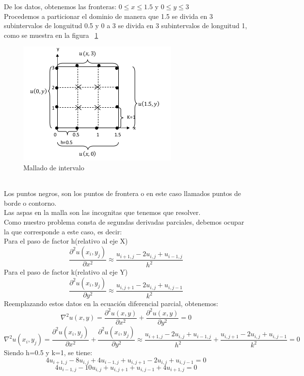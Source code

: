 \documentclass[11pt,a4paper]{article}
\begin{document}
De los datos, obtenemos las fronteras: $ 0 \le x \le 1.5$ y $ 0 \le y \le 3 $\\
Procedemos a particionar el dominio de manera que 1.5 se divida en 3 subintervalos de longuitud 0.5 y 0 a 3 se divida en 3 subintervalos de longuitud 1, como se muestra en la figura ~\ref{figura3}
\begin{figure}[htbp]
\begin{center}
\includegraphics[scale=0.75]{img_Sol_1}
\caption{Mallado de intervalo}
\label{figura3}
\end{center}
\end{figure}
\\Los puntos negros, son los puntos de frontera o en este caso llamados puntos de borde o contorno.\\Las aspas en la malla son las incognitas que tenemos que resolver.\\
Como nuestro problema consta de segundas derivadas parciales, debemos ocupar la que corresponde a este caso, es decir:\\
Para el paso de factor h(relativo al eje X)\\
$$
\frac{\partial^2 u(x_{i},y_{j})}{\partial x^2} \approx \frac{u_{i+1,j}-2u_{i,j}+u_{i-1,j}}{h^2}
$$
Para el paso de factor k(relativo al eje Y)\\
$$
\frac{\partial^2 u(x_{i},y_{j})}{\partial y^2} \approx \frac{u_{i,j+1}-2u_{i,j}+u_{i,j-1}}{k^2}
$$
Reemplazando estos datos en la ecuación diferencial parcial, obtenemos:
$$
\nabla^2 u(x,y) = \frac{\partial^2 u(x,y)}{\partial x^2} + \frac{\partial^2 u(x,y)}{\partial y^2} = 0
$$
$$
\nabla^2 u(x_{i},y_{j}) = \frac{\partial^2 u(x_{i},y_{j})}{\partial x^2} + \frac{\partial^2 u(x_{i},y_{j})}{\partial y^2} \approx \frac{u_{i+1,j}-2u_{i,j}+u_{i-1,j}}{h^2} + \frac{u_{i,j+1}-2u_{i,j}+u_{i,j-1}}{k^2} = 0
$$
Siendo h=0.5 y k=1, se tiene:
$$
4u_{i+1,j}-8u_{i,j}+4u_{i-1,j} + u_{i,j+1}-2u_{i,j}+u_{i,j-1} = 0
$$
$$
4u_{i-1,j} - 10u_{i,j} + u_{i,j+1} + u_{i,j-1} + 4u_{i+1,j}=0
$$
\end{document}
